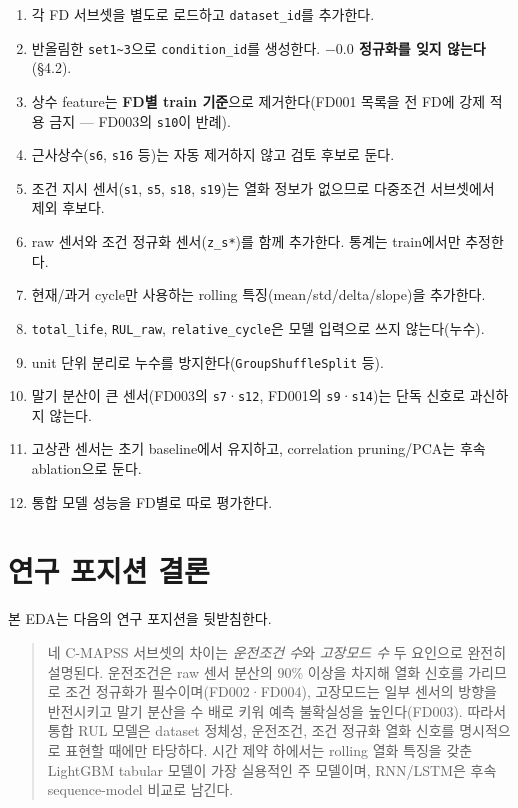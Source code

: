 \documentclass[11pt]{article}
\begin{document}
\begin{enumerate}[nosep]
  \item 각 FD 서브셋을 별도로 로드하고 \texttt{dataset\_id}를 추가한다.
  \item 반올림한 \texttt{set1\textasciitilde3}으로 \texttt{condition\_id}를 생성한다. \textbf{$-0.0$ 정규화를 잊지 않는다}(\S4.2).
  \item 상수 feature는 \textbf{FD별 train 기준}으로 제거한다(FD001 목록을 전 FD에 강제 적용 금지 — FD003의 \texttt{s10}이 반례).
  \item 근사상수(\texttt{s6}, \texttt{s16} 등)는 자동 제거하지 않고 검토 후보로 둔다.
  \item 조건 지시 센서(\texttt{s1}, \texttt{s5}, \texttt{s18}, \texttt{s19})는 열화 정보가 없으므로 다중조건 서브셋에서 제외 후보다.
  \item raw 센서와 조건 정규화 센서(\texttt{z\_s*})를 함께 추가한다. 통계는 train에서만 추정한다.
  \item 현재/과거 cycle만 사용하는 rolling 특징(mean/std/delta/slope)을 추가한다.
  \item \texttt{total\_life}, \texttt{RUL\_raw}, \texttt{relative\_cycle}은 모델 입력으로 쓰지 않는다(누수).
  \item unit 단위 분리로 누수를 방지한다(\texttt{GroupShuffleSplit} 등).
  \item 말기 분산이 큰 센서(FD003의 \texttt{s7}·\texttt{s12}, FD001의 \texttt{s9}·\texttt{s14})는 단독 신호로 과신하지 않는다.
  \item 고상관 센서는 초기 baseline에서 유지하고, correlation pruning/PCA는 후속 ablation으로 둔다.
  \item 통합 모델 성능을 FD별로 따로 평가한다.
\end{enumerate}

\section{연구 포지션 결론}

본 EDA는 다음의 연구 포지션을 뒷받침한다.

\begin{quote}
네 C-MAPSS 서브셋의 차이는 \emph{운전조건 수}와 \emph{고장모드 수} 두 요인으로 완전히 설명된다.
운전조건은 raw 센서 분산의 90\% 이상을 차지해 열화 신호를 가리므로 조건 정규화가 필수이며(FD002·FD004),
고장모드는 일부 센서의 방향을 반전시키고 말기 분산을 수 배로 키워 예측 불확실성을 높인다(FD003).
따라서 통합 RUL 모델은 dataset 정체성, 운전조건, 조건 정규화 열화 신호를 명시적으로 표현할 때에만 타당하다.
시간 제약 하에서는 rolling 열화 특징을 갖춘 LightGBM tabular 모델이 가장 실용적인 주 모델이며,
RNN/LSTM은 후속 sequence-model 비교로 남긴다.
\end{quote}
\end{document}
